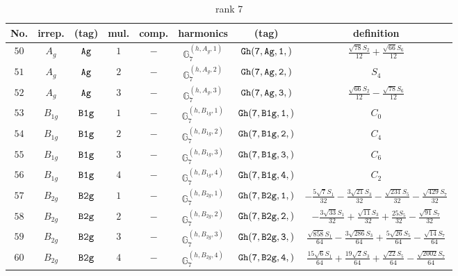 \documentclass[fleqn,8pt]{jsarticle}
\begin{document}
\begin{table}[ht!]
\begin{center}
\caption{rank 7}
\renewcommand{\arraystretch}{1.3}
\begin{tabular}{cccccccc} \hline \hline
No. & irrep. & (tag) & mul. & comp. & harmonics & (tag) & definition \\ \hline
$ 50 $ & $ A_{g} $ & $ {\tt Ag} $ & $ 1 $ & $ - $ & $ \mathbb{G}_{7}^{(h,A_{g},1)} $ & $ {\tt Gh(7,Ag,1,)} $ & $ \frac{\sqrt{78} S_{2}}{12} + \frac{\sqrt{66} S_{6}}{12} $ \\
$ 51 $ & $ A_{g} $ & $ {\tt Ag} $ & $ 2 $ & $ - $ & $ \mathbb{G}_{7}^{(h,A_{g},2)} $ & $ {\tt Gh(7,Ag,2,)} $ & $ S_{4} $ \\
$ 52 $ & $ A_{g} $ & $ {\tt Ag} $ & $ 3 $ & $ - $ & $ \mathbb{G}_{7}^{(h,A_{g},3)} $ & $ {\tt Gh(7,Ag,3,)} $ & $ \frac{\sqrt{66} S_{2}}{12} - \frac{\sqrt{78} S_{6}}{12} $ \\
$ 53 $ & $ B_{1g} $ & $ {\tt B1g} $ & $ 1 $ & $ - $ & $ \mathbb{G}_{7}^{(h,B_{1g},1)} $ & $ {\tt Gh(7,B1g,1,)} $ & $ C_{0} $ \\
$ 54 $ & $ B_{1g} $ & $ {\tt B1g} $ & $ 2 $ & $ - $ & $ \mathbb{G}_{7}^{(h,B_{1g},2)} $ & $ {\tt Gh(7,B1g,2,)} $ & $ C_{4} $ \\
$ 55 $ & $ B_{1g} $ & $ {\tt B1g} $ & $ 3 $ & $ - $ & $ \mathbb{G}_{7}^{(h,B_{1g},3)} $ & $ {\tt Gh(7,B1g,3,)} $ & $ C_{6} $ \\
$ 56 $ & $ B_{1g} $ & $ {\tt B1g} $ & $ 4 $ & $ - $ & $ \mathbb{G}_{7}^{(h,B_{1g},4)} $ & $ {\tt Gh(7,B1g,4,)} $ & $ C_{2} $ \\
$ 57 $ & $ B_{2g} $ & $ {\tt B2g} $ & $ 1 $ & $ - $ & $ \mathbb{G}_{7}^{(h,B_{2g},1)} $ & $ {\tt Gh(7,B2g,1,)} $ & $ - \frac{5 \sqrt{7} S_{1}}{32} - \frac{3 \sqrt{21} S_{3}}{32} - \frac{\sqrt{231} S_{5}}{32} - \frac{\sqrt{429} S_{7}}{32} $ \\
$ 58 $ & $ B_{2g} $ & $ {\tt B2g} $ & $ 2 $ & $ - $ & $ \mathbb{G}_{7}^{(h,B_{2g},2)} $ & $ {\tt Gh(7,B2g,2,)} $ & $ - \frac{3 \sqrt{33} S_{1}}{32} + \frac{\sqrt{11} S_{3}}{32} + \frac{25 S_{5}}{32} - \frac{\sqrt{91} S_{7}}{32} $ \\
$ 59 $ & $ B_{2g} $ & $ {\tt B2g} $ & $ 3 $ & $ - $ & $ \mathbb{G}_{7}^{(h,B_{2g},3)} $ & $ {\tt Gh(7,B2g,3,)} $ & $ \frac{\sqrt{858} S_{1}}{64} - \frac{3 \sqrt{286} S_{3}}{64} + \frac{5 \sqrt{26} S_{5}}{64} - \frac{\sqrt{14} S_{7}}{64} $ \\
$ 60 $ & $ B_{2g} $ & $ {\tt B2g} $ & $ 4 $ & $ - $ & $ \mathbb{G}_{7}^{(h,B_{2g},4)} $ & $ {\tt Gh(7,B2g,4,)} $ & $ \frac{15 \sqrt{6} S_{1}}{64} + \frac{19 \sqrt{2} S_{3}}{64} + \frac{\sqrt{22} S_{5}}{64} - \frac{\sqrt{2002} S_{7}}{64} $ \\

\end{tabular}
\end{center}
\end{table}
\end{document}
